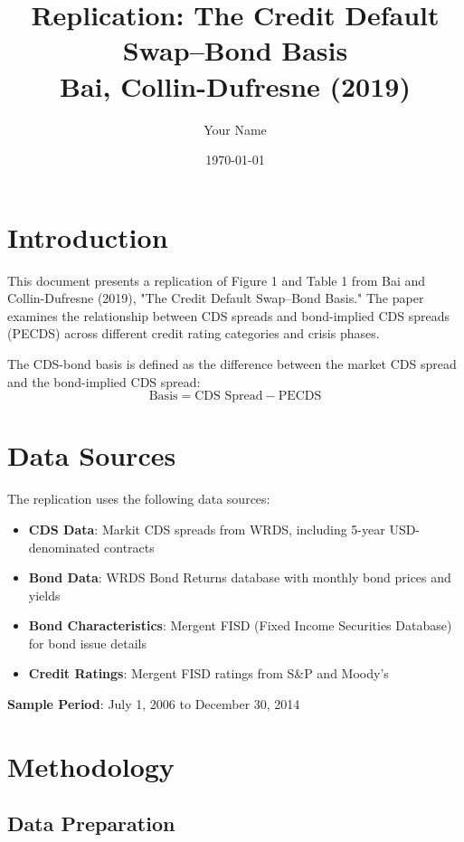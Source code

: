 \documentclass{article}
\title{Replication: The Credit Default Swap–Bond Basis \\
\large Bai, Collin-Dufresne (2019)}
\author{Your Name}
\date{\today}
\begin{document}
\maketitle

\section{Introduction}

This document presents a replication of Figure 1 and Table 1 from Bai and Collin-Dufresne (2019), "The Credit Default Swap–Bond Basis." The paper examines the relationship between CDS spreads and bond-implied CDS spreads (PECDS) across different credit rating categories and crisis phases.

The CDS-bond basis is defined as the difference between the market CDS spread and the bond-implied CDS spread:
\begin{equation}
    \text{Basis} = \text{CDS Spread} - \text{PECDS}
\end{equation}

\section{Data Sources}

The replication uses the following data sources:

\begin{itemize}
    \item \textbf{CDS Data}: Markit CDS spreads from WRDS, including 5-year USD-denominated contracts
    \item \textbf{Bond Data}: WRDS Bond Returns database with monthly bond prices and yields
    \item \textbf{Bond Characteristics}: Mergent FISD (Fixed Income Securities Database) for bond issue details
    \item \textbf{Credit Ratings}: Mergent FISD ratings from S\&P and Moody's
\end{itemize}

\textbf{Sample Period}: July 1, 2006 to December 30, 2014

\section{Methodology}

\subsection{Data Preparation}
\end{document}
